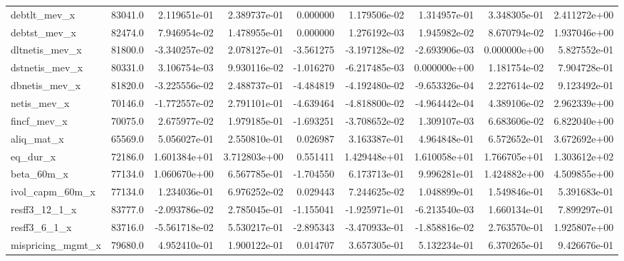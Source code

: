\documentclass[10pt]{article}
\begin{document}
\begin{landscape}
\begin{longtable}{lrrrrrrrr}
debtlt\_mev\_x            &   83041.0 &  2.119651e-01 &  2.389737e-01 &      0.000000 &  1.179506e-02 &  1.314957e-01 &  3.348305e-01 &  2.411272e+00 \\
debtst\_mev\_x            &   82474.0 &  7.946954e-02 &  1.478955e-01 &      0.000000 &  1.276192e-03 &  1.945982e-02 &  8.670794e-02 &  1.937046e+00 \\
dltnetis\_mev\_x          &   81800.0 & -3.340257e-02 &  2.078127e-01 &     -3.561275 & -3.197128e-02 & -2.693906e-03 &  0.000000e+00 &  5.827552e-01 \\
dstnetis\_mev\_x          &   80331.0 &  3.106754e-03 &  9.930116e-02 &     -1.016270 & -6.217485e-03 &  0.000000e+00 &  1.181754e-02 &  7.904728e-01 \\
dbnetis\_mev\_x           &   81820.0 & -3.225556e-02 &  2.488737e-01 &     -4.484819 & -4.192480e-02 & -9.653326e-04 &  2.227614e-02 &  9.123492e-01 \\
netis\_mev\_x             &   70146.0 & -1.772557e-02 &  2.791101e-01 &     -4.639464 & -4.818800e-02 & -4.964442e-04 &  4.389106e-02 &  2.962339e+00 \\
fincf\_mev\_x             &   70075.0 &  2.675977e-02 &  1.979185e-01 &     -1.693251 & -3.708652e-02 &  1.309107e-03 &  6.683606e-02 &  6.822040e+00 \\
aliq\_mat\_x              &   65569.0 &  5.056027e-01 &  2.550810e-01 &      0.026987 &  3.163387e-01 &  4.964848e-01 &  6.572652e-01 &  3.672692e+00 \\
eq\_dur\_x                &   72186.0 &  1.601384e+01 &  3.712803e+00 &      0.551411 &  1.429448e+01 &  1.610058e+01 &  1.766705e+01 &  1.303612e+02 \\
beta\_60m\_x              &   77134.0 &  1.060670e+00 &  6.567785e-01 &     -1.704550 &  6.173713e-01 &  9.996281e-01 &  1.424882e+00 &  4.509855e+00 \\
ivol\_capm\_60m\_x         &   77134.0 &  1.234036e-01 &  6.976252e-02 &      0.029443 &  7.244625e-02 &  1.048899e-01 &  1.549846e-01 &  5.391683e-01 \\
resff3\_12\_1\_x           &   83777.0 & -2.093786e-02 &  2.785045e-01 &     -1.155041 & -1.925971e-01 & -6.213540e-03 &  1.660134e-01 &  7.899297e-01 \\
resff3\_6\_1\_x            &   83716.0 & -5.561718e-02 &  5.530217e-01 &     -2.895343 & -3.470933e-01 & -1.858816e-02 &  2.763570e-01 &  1.925807e+00 \\
mispricing\_mgmt\_x       &   79680.0 &  4.952410e-01 &  1.900122e-01 &      0.014707 &  3.657305e-01 &  5.132234e-01 &  6.370265e-01 &  9.426676e-01 \\

\end{longtable}
\end{landscape}
\end{document}
